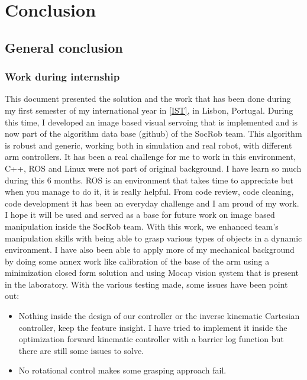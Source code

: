 
\chapter{Conclusion}
\label{chapter:conclusion}

\section{General conclusion}
\subsection{Work during internship}
This document presented the solution and the work that has been done during my first semester of my international year in \ref{IST}, in Lisbon, Portugal. During this time, I developed an image based visual servoing that is implemented and is now part of the algorithm data base (github) of the SocRob team. This algorithm is robust and generic, working both in simulation and real robot, with different arm controllers. It has been a real challenge for me to work in this environment, C++, ROS and Linux were not part of original background. I have learn so much during this 6 months. ROS is an environment that takes time to appreciate but when you manage to do it, it is really helpful. From code review, code cleaning, code development it has been an everyday challenge and I am proud of my work. I hope it will be used and served as a base for future work on image based manipulation inside the SocRob team. 
With this work, we enhanced team’s manipulation skills with being able to grasp various types of objects in a dynamic environment.
I have also been able to apply more of my mechanical background by doing some annex work like calibration of the base of the arm using a minimization closed form solution and using Mocap vision system that is present in the laboratory.
With the various testing made, some issues have been point out:
\begin{itemize}
    \item Nothing inside the design of our controller or the inverse kinematic Cartesian controller, keep the feature insight. I have tried to implement it inside the optimization forward kinematic controller with a barrier log function but there are still some issues to solve.
    \item No rotational control makes some grasping approach fail. 
\end{itemize}

